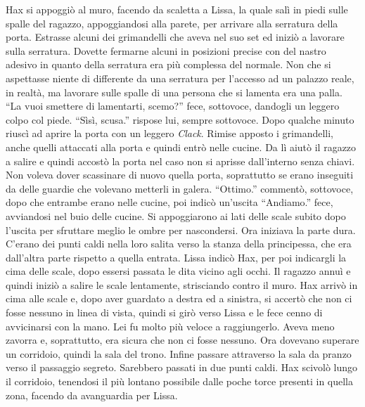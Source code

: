     Hax si appoggiò al muro, facendo da scaletta a Lissa, la quale salì in
    piedi sulle spalle del ragazzo, appoggiandosi alla parete, per arrivare
    alla serratura della porta. Estrasse alcuni dei grimandelli che aveva
    nel suo set ed iniziò a lavorare sulla serratura. Dovette fermarne
    alcuni in posizioni precise con del nastro adesivo in quanto della
    serratura era più complessa del normale. Non che si aspettasse niente
    di differente da una serratura per l'accesso ad un palazzo reale, in
    realtà, ma lavorare sulle spalle di una persona che si lamenta era una
    palla. ``La vuoi smettere di lamentarti, scemo?'' fece, sottovoce,
    dandogli un leggero colpo col piede. ``Sìsì, scusa.'' rispose lui,
    sempre sottovoce. Dopo qualche minuto riuscì ad aprire la porta con un
    leggero \emph{Clack}. Rimise apposto i grimandelli, anche quelli
    attaccati alla porta e quindi entrò nelle cucine. Da lì aiutò il
    ragazzo a salire e quindi accostò la porta nel caso non si aprisse
    dall'interno senza chiavi. Non voleva dover scassinare di nuovo quella
    porta, soprattutto se erano inseguiti da delle guardie che volevano
    metterli in galera. ``Ottimo.'' commentò, sottovoce, dopo che entrambe
    erano nelle cucine, poi indicò un'uscita ``Andiamo.'' fece, avviandosi
    nel buio delle cucine. Si appoggiarono ai lati delle scale subito dopo
    l'uscita per sfruttare meglio le ombre per nascondersi. Ora iniziava la
    parte dura. C'erano dei punti caldi nella loro salita verso la stanza
    della principessa, che era dall'altra parte rispetto a quella entrata.
    Lissa indicò Hax, per poi indicargli la cima delle scale, dopo essersi
    passata le dita vicino agli occhi. Il ragazzo annuì e quindi iniziò a
    salire le scale lentamente, strisciando contro il muro. Hax arrivò in
    cima alle scale e, dopo aver guardato a destra ed a sinistra, si
    accertò che non ci fosse nessuno in linea di vista, quindi si girò
    verso Lissa e le fece cenno di avvicinarsi con la mano. Lei fu molto
    più veloce a raggiungerlo. Aveva meno zavorra e, soprattutto, era
    sicura che non ci fosse nessuno. Ora dovevano superare un corridoio,
    quindi la sala del trono. Infine passare attraverso la sala da pranzo
    verso il passaggio segreto. Sarebbero passati in due punti caldi. Hax
    scivolò lungo il corridoio, tenendosi il più lontano possibile dalle
    poche torce presenti in quella zona, facendo da avanguardia per Lissa.
    
